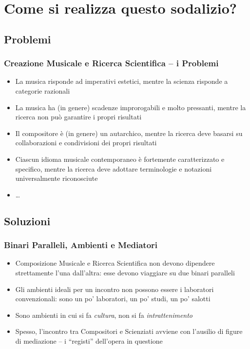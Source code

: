 \documentclass[compress]{beamer}
\begin{document}
\section[Come]{Come si realizza questo sodalizio?}

\subsection{Problemi}

\begin{frame}
    \frametitle{Creazione Musicale e Ricerca Scientifica -- i Problemi}

    \begin{itemize}[<+- | alert@+->]
        \item La musica risponde ad imperativi estetici, mentre la scienza
            risponde a categorie razionali
        \item La musica ha (in genere) scadenze improrogabili e molto
            pressanti, mentre la ricerca non pu\`o garantire i propri
            risultati
        \item Il compositore \`e (in genere) un autarchico, mentre la ricerca
            deve basarsi su collaborazioni e condivisioni dei propri risultati
        \item Ciascun idioma musicale contemporaneo \`e fortemente
            caratterizzato e specifico, mentre la ricerca deve adottare
            terminologie e notazioni universalmente riconosciute
        \item \ldots
    \end{itemize}

\end{frame}

\subsection{Soluzioni}

\begin{frame}
    \frametitle{Binari Paralleli, Ambienti e Mediatori}

    \begin{itemize}[<+- | alert@+->]
        \item Composizione Musicale e Ricerca Scientifica non devono dipendere
            strettamente l'una dall'altra: esse devono viaggiare su due binari
            paralleli
        \item Gli ambienti ideali per un incontro non possono essere i laboratori
            convenzionali: sono un po' laboratori, un po' studi, un po'
            salotti
        \item Sono ambienti in cui si fa \emph{cultura}, non si fa \emph{intrattenimento}
        \item Spesso, l'incontro tra Compositori e Scienziati avviene con
            l'ausilio di figure di mediazione -- i ``registi'' dell'opera in
            questione
    \end{itemize}
    
\end{frame}
\end{document}
